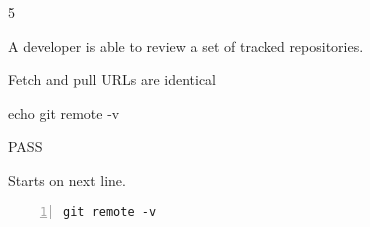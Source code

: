 \begin{description}[align=right,leftmargin=3.2cm,labelindent=3.0cm]
\item[Step:] 5
\item[Confirm:] A developer is able to review a set of tracked repositories.
\item[Expectation:] Fetch and pull URLs are identical
\item[Command:] echo git  remote -v
\item[Test Result:] PASS
\item[Evidence:] Starts on next line.
\end{description}
\begin{lstlisting}[numbers=left]
git remote -v

\end{lstlisting}

